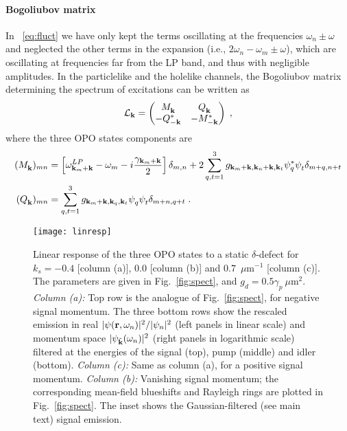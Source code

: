 \paragraph{Bogoliubov matrix}
In ~\eqref{eq:fluct} we have only kept the terms oscillating at the
frequencies $\omega_n \pm \omega$ and neglected the other terms in the
expansion (i.e., $2\omega_n - \omega_m \pm \omega$), which are
oscillating at frequencies far from the LP band, and thus with
negligible amplitudes.
%
In the particlelike and the holelike channels, the Bogoliubov matrix
determining the spectrum of excitations can be written
as~\cite{Wouters_2007}
%
\begin{equation}\label{eq:bogoliubov-opo}
  \mathcal{L}_{\mathbf{k}} = \begin{pmatrix} M_{\mathbf{k}}^{} & Q_{\mathbf{k}}^{}
    \\ -Q_{-\mathbf{k}}^* & -M_{-\mathbf{k}}^* \end{pmatrix} \; ,
\end{equation}
%
where the three OPO states components are
%
\begin{align}
  (M_{\vt{k}}^{})_{mn} &= \left[\omega^{LP}_{\vt{k}_m + \vt{k}}
    - \omega_m - i\frac{\gamma_{\vt{k}_m + \vt{k}}}{2}\right]
  \delta_{m,n}
   + 2\sum_{q,t=1}^3
  g_{\vt{k}_m+\vt{k},\vt{k}_n+\vt{k},\vt{k}_t} \psi_q^*
  \psi_t^{} \delta_{m+q,n+t}\nonumber\\
%
  (Q_{\vt{k}}^{})_{mn} &= \sum_{q,t=1}^3
  g_{\vt{k}_m+\vt{k},\vt{k}_q,\vt{k}_t} \psi_q^{} \psi_t^{}
  \delta_{m+n,q+t}\; .
\end{align}
\begin{figure}[tb]
\centering
\texttt{[image: linresp]}
\caption{Linear response of the three OPO states to a static
  $\delta$-defect for $k_s = -0.4$ [column (a)], $0.0$ [column (b)] and
  $0.7$~$\mu$m$^{-1}$ [column (c)]. The parameters are given in
  Fig.~\ref{fig:spect}, and $g_d = 0.5 \gamma_p~\mu$m$^2$.  \emph{Column
    (a):} Top row is the analogue of Fig.~\ref{fig:spect}, for negative
  signal momentum. The three bottom rows show the rescaled emission in
  real $|\psi (\mathbf{r},\omega_n)|^2/|\psi_n|^2$ (left panels in linear
  scale) and momentum space $|\psi_{\tilde{\mathbf{k}}} (\omega_n)|^2$
  (right panels in logarithmic scale) filtered at the energies of the
  signal (top), pump (middle) and idler (bottom).  \emph{Column (c):} Same
  as column (a), for a positive signal momentum.  \emph{Column (b):}
  Vanishing signal momentum; the corresponding mean-field blueshifts and
  Rayleigh rings are plotted in Fig.~\ref{fig:spect}. The inset shows
  the Gaussian-filtered (see main text) signal emission.}
\label{fig:ereal}
\end{figure}
%

